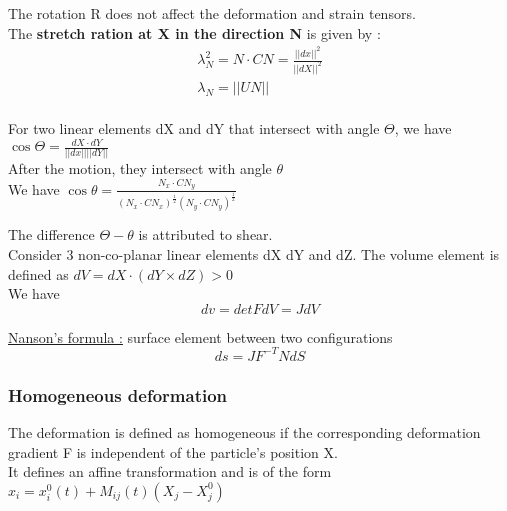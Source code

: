 \documentclass[../main.tex]{subfiles}
\begin{document}
\warning The rotation R does not affect the deformation and strain tensors.\\

The \textbf{stretch ration at X in the direction N} is given by : \begin{equation} \begin{gathered}
    \lambda_N^2 = N\cdot CN = \frac{\lvert \lvert dx\rvert \rvert^2}{\lvert \lvert dX\rvert \rvert^2}\\
    \lambda_N = \lvert \lvert UN\rvert \rvert\\
\end{gathered}
\end{equation}

For two linear elements dX and dY that intersect with angle $\Theta$, we have $\cos \Theta = \frac{dX\cdot dY}{\lvert \lvert dx\rvert \rvert \lvert \lvert dY\rvert \rvert}$\\
After the motion, they intersect with angle $\theta$\\

We have $\cos \theta = \frac{N_x \cdot CN_y}{(N_x\cdot CN_x)^{\frac{1}{2}}(N_y\cdot CN_y)^{\frac{1}{2}}}$

\warning The difference $\Theta-\theta$ is attributed to shear.\\

Consider 3 non-co-planar linear elements dX dY and dZ. The volume element is defined as $dV = dX\cdot (dY\times dZ)>0$\\
We have \begin{equation}
    dv = det FdV = JdV
\end{equation}


\quad \underline{Nanson's formula :} surface element between two configurations\\

\begin{equation}
    ds = JF^{-T}NdS
\end{equation}

\subsubsection{Homogeneous deformation}
The deformation is defined as homogeneous if the corresponding deformation gradient F is independent of the particle's position X.\\

It defines an affine transformation and is of the form $x_i = x_i^0(t) + M_{ij}(t) (X_j-X_j^0)$\\
\end{document}
